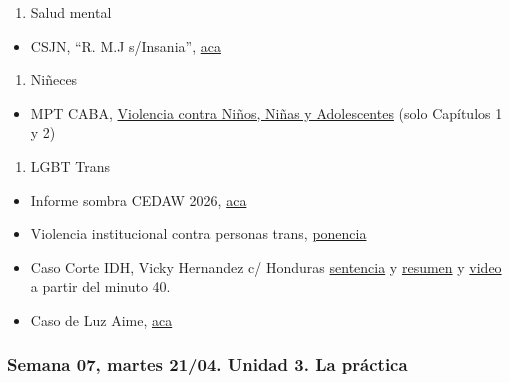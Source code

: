 \documentclass[
]{article}
\providecommand{\tightlist}{%
  \setlength{\itemsep}{0pt}\setlength{\parskip}{0pt}}
\begin{document}
\begin{enumerate}
\def\labelenumi{\alph{enumi}.}
\setcounter{enumi}{3}
\tightlist
\item
  Salud mental
\end{enumerate}

\begin{itemize}
\tightlist
\item
  CSJN, ``R. M.J s/Insania'',
  \href{https://drive.google.com/file/d/1c29zw3cQDmwNGuO-GDR15KUq7Xc-UZJb/view?usp=sharing}{aca}
\end{itemize}

\begin{enumerate}
\def\labelenumi{\alph{enumi}.}
\setcounter{enumi}{4}
\tightlist
\item
  Niñeces
\end{enumerate}

\begin{itemize}
\tightlist
\item
  MPT CABA,
  \href{https://drive.google.com/file/d/1lc3H955K8Wx1-7mdtDAJX--CBBcqXfuX/view?usp=sharing}{Violencia
  contra Niños, Niñas y Adolescentes} (solo Capítulos 1 y 2)
\end{itemize}

\begin{enumerate}
\def\labelenumi{\alph{enumi}.}
\setcounter{enumi}{3}
\tightlist
\item
  LGBT Trans
\end{enumerate}

\begin{itemize}
\item
  Informe sombra CEDAW 2026,
  \href{https://drive.google.com/file/d/1-MXugF9SyQNYE-aD3kk4VbEC-W0ZqdvX/view?usp=sharing}{aca}
\item
  Violencia institucional contra personas trans,
  \href{https://drive.google.com/file/d/1NWDuVTHVpSSWbHTuvP6WPAy6waXvDyXo/view}{ponencia}
\item
  Caso Corte IDH, Vicky Hernandez c/ Honduras
  \href{https://www.corteidh.or.cr/docs/casos/articulos/seriec_422_esp.pdf}{sentencia}
  y
  \href{https://www.corteidh.or.cr/docs/casos/articulos/resumen_422_esp.pdf}{resumen}
  y \href{https://www.youtube.com/watch?v=5AXht8vR6l8}{video} a partir
  del minuto 40.
\item
  Caso de Luz Aime,
  \href{https://www.cosecharoja.org/absolucion-para-luz-le-quieren-dar-perpetua-por-trans-y-pobre/}{aca}
\end{itemize}

\subsubsection{Semana 07, martes 21/04. Unidad 3. La
práctica}\label{semana-07-martes-2104.-unidad-3.-la-pruxe1ctica}
\end{document}
